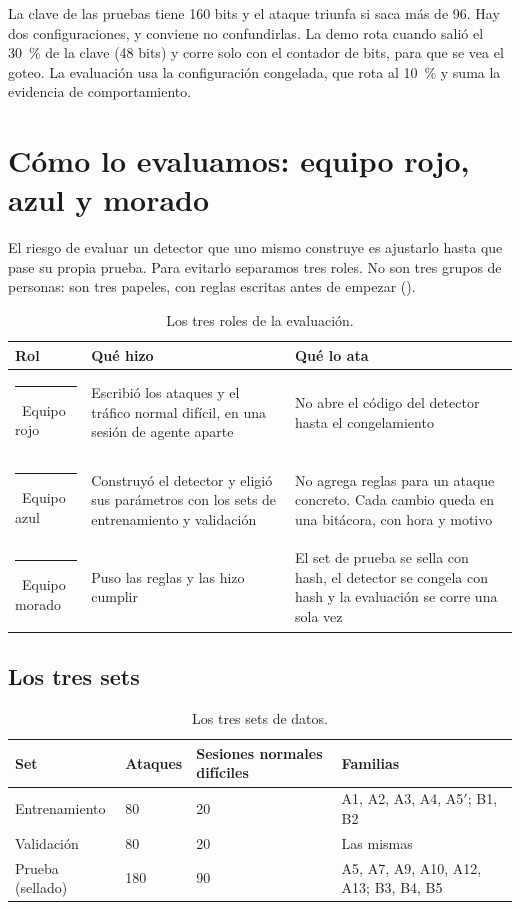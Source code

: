 La clave de las pruebas tiene 160 bits y el ataque triunfa si saca más de 96. Hay dos configuraciones,
y conviene no confundirlas. La demo rota cuando salió el \qty{30}{\percent} de la clave (48 bits) y
corre solo con el contador de bits, para que se vea el goteo. La evaluación usa la configuración
congelada, que rota al \qty{10}{\percent} y suma la evidencia de comportamiento.

\section{Cómo lo evaluamos: equipo rojo, azul y morado}\label{sec:evaluamos}

El riesgo de evaluar un detector que uno mismo construye es ajustarlo hasta que pase su propia prueba.
Para evitarlo separamos tres roles. No son tres grupos de personas: son tres papeles, con reglas
escritas antes de empezar ().

\begin{table}[ht]
\caption{Los tres roles de la evaluación.}\label{tab:roles}
\small
\begin{tabularx}{\textwidth}{@{}P{2.4cm}LL@{}}
\toprule
Rol & Qué hizo & Qué lo ata \\
\midrule
\textcolor{rojoeq}{\rule{0.55em}{0.55em}}\ Equipo rojo & Escribió los ataques y el tráfico normal
  difícil, en una sesión de agente aparte & No abre el código del detector hasta el congelamiento \\
\textcolor{azuleq}{\rule{0.55em}{0.55em}}\ Equipo azul & Construyó el detector y eligió sus parámetros
  con los sets de entrenamiento y validación & No agrega reglas para un ataque concreto. Cada cambio
  queda en una bitácora, con hora y motivo \\
\textcolor{moradoeq}{\rule{0.55em}{0.55em}}\ Equipo morado & Puso las reglas y las hizo cumplir & El
  set de prueba se sella con hash, el detector se congela con hash y la evaluación se corre una sola
  vez \\
\bottomrule
\end{tabularx}
\end{table}

\subsection{Los tres sets}

\begin{table}[ht]
\caption{Los tres sets de datos.}\label{tab:sets}
\small
\begin{tabularx}{\textwidth}{@{}P{3.2cm}R{1.5cm}R{3.2cm}L@{}}
\toprule
Set & Ataques & Sesiones normales difíciles & Familias \\
\midrule
Entrenamiento & 80 & 20 & A1, A2, A3, A4, A5$'$; B1, B2 \\
Validación & 80 & 20 & Las mismas \\
Prueba (sellado) & 180 & 90 & A5, A7, A9, A10, A12, A13; B3, B4, B5 \\
\bottomrule
\end{tabularx}
\end{table}

